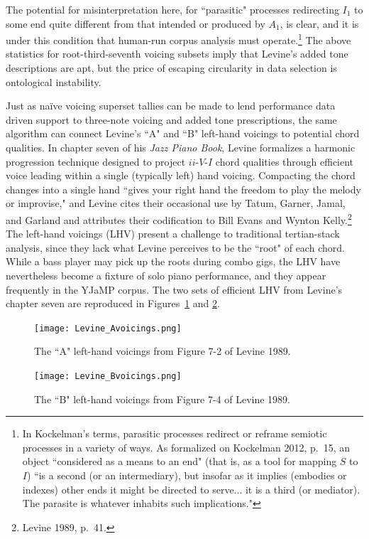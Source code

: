 The potential for misinterpretation here, for ``parasitic" processes redirecting $I_1$ to some end quite different from that intended or produced by $A_1$, is clear, and it is under this condition that human-run corpus analysis must operate.\footnote{In Kockelman's terms, parasitic processes redirect or reframe semiotic processes in a variety of ways.  As formalized on Kockelman 2012, p.\ 15, an object ``considered as a means to an end" (that is, as a tool for mapping $S$ to $I$) ``is a second (or an intermediary), but insofar as it implies (embodies or indexes) other ends it might be directed to serve... it is a third (or mediator).  The parasite is whatever inhabits such implications."}  The above statistics for root-third-seventh voicing subsets imply that Levine's added tone descriptions are apt, but the price of escaping circularity in data selection is ontological instability.

Just as na\"{i}ve voicing superset tallies can be made to lend performance data driven support to three-note voicing and added tone prescriptions, the same algorithm can connect Levine's ``A" and ``B" left-hand voicings to potential chord qualities.  In chapter seven of his \emph{Jazz Piano Book}, Levine formalizes a harmonic progression technique designed to project $ii$-$V$-$I$ chord qualities through efficient voice leading within a single (typically left) hand voicing.  Compacting the chord changes into a single hand ``gives your right hand the freedom to play the melody or improvise," and Levine cites their occasional use by Tatum, Garner, Jamal, and Garland and attributes their codification to Bill Evans and Wynton Kelly.\footnote{Levine 1989, p.\ 41.}  The left-hand voicings (LHV) present a challenge to traditional tertian-stack analysis, since they lack what Levine perceives to be the ``root" of each chord.  While a bass player may pick up the roots during combo gigs, the LHV have nevertheless become a fixture of solo piano performance, and they appear frequently in the YJaMP corpus.  The two sets of efficient LHV from Levine's chapter seven are reproduced in Figures~\ref{levine_Avcg} and \ref{levine_Bvcg}.

\begin{figure}%
	\centering
	\texttt{[image: Levine\_Avoicings.png]}
	\caption{The ``A" left-hand voicings from Figure 7-2 of Levine 1989.}
	\label{levine_Avcg}
\end{figure}
\begin{figure}%
	\centering
	\texttt{[image: Levine\_Bvoicings.png]}
	\caption{The ``B" left-hand voicings from Figure 7-4 of Levine 1989.}
	\label{levine_Bvcg}
\end{figure}

